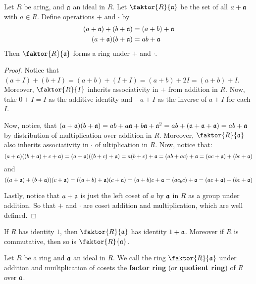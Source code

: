 \begin{theorem}\label{theorem_5.3.3}
  Let $R$ be aring, and $\mathfrak{a}$ an ideal in $R$. Let  $\faktor{R}{\af}$ be the set
  of all $a+\mathfrak{a}$ with  $a \in R$. Define operations $+$ and $\cdot$ by
  \begin{align*}
    (a+\mathfrak{a})+(b+\mathfrak{a}) &=  (a+b)+\mathfrak{a} \\
    (a+\mathfrak{a})(b+\mathfrak{a})  &=  ab+\mathfrak{a}    \\
  \end{align*}
  Then $\faktor{R}{\af}$ forms a ring under $+$ and $\cdot$.
\end{theorem}
\begin{proof}
  Notice that $(a+I)+(b+I)=(a+b)+(I+I)=(a+b)+2I=(a+b)+I$. Moreover,
  $\faktor{R}{I}$ inherits associativity in $+$ from addition in $R$. Now,
  take $0+I=I$ as the additive identity and  $-a+I$ as the inverse of  $a+I$
  for each  $I$.

  Now, notice, that $(a+\mathfrak{a})(b+\mathfrak{a})=ab+a\mathfrak{a}+b\mathfrak{a}+\mathfrak{a}^2=ab+(\mathfrak{a}+\mathfrak{a}+\mathfrak{a})=
  ab+\mathfrak{a}$ by distribution of multiplication over addition in $R$. Moreover,
  $\faktor{R}{\af}$ also inherits associativity in $\cdot$ of ultiplication in
  $R$. Now, notice that:
  \begin{equation*}
    (a+\mathfrak{a})((b+\mathfrak{a})+c+\mathfrak{a})=(a+\mathfrak{a})((b+c)+\mathfrak{a})=a(b+c)+\mathfrak{a}=(ab+ac)+\mathfrak{a}=(ac+\mathfrak{a})+(bc+\mathfrak{a})
  \end{equation*}
  and
  \begin{equation*}
    ((a+\mathfrak{a})+(b+\mathfrak{a}))(c+\mathfrak{a})=((a+b)+\mathfrak{a})(c+\mathfrak{a})=(a+b)c+\mathfrak{a}=(ac_bc)+\mathfrak{a}=(ac+\mathfrak{a})+(bc+\mathfrak{a})
  \end{equation*}

  Lastly, notice that $a+\mathfrak{a}$ is just the left coset of  $a$ by $\mathfrak{a}$ in $R$ as a
  group under addition. So that $+$ and  $\cdot$ are coset addition and
  multiplication, which are well defined.
\end{proof}
\begin{corollary}
  If $R$ has identity $1$, then $\faktor{R}{\af}$ has identity
  $1+\mathfrak{a}$. Moreover if  $R$ is commutative, then so is $\faktor{R}{\af}$.
\end{corollary}

\begin{definition}
  Let $R$ be a ring and $\mathfrak{a}$ an ideal in $R$. We call the ring
  $\faktor{R}{\af}$
  under addition and muiltplication of cosets the \textbf{factor ring} (or
  \textbf{quotient ring}) of $R$ over  $\mathfrak{a}$.
\end{definition}

